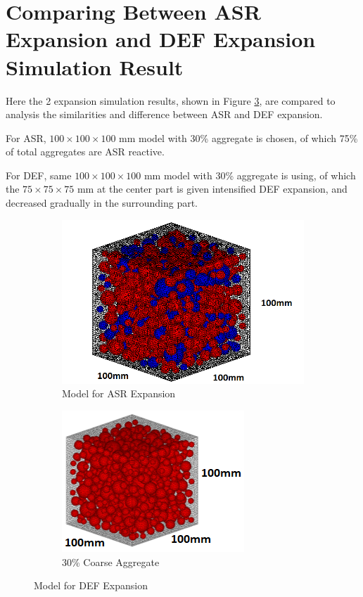 \clearpage
\section{Comparing Between ASR Expansion and DEF Expansion Simulation Result}


Here the 2 expansion simulation results, shown in Figure \ref{fig:Aggreddddate_Percentage}, are compared to analysis the similarities and difference between ASR and DEF expansion.

For ASR, $100 \times 100 \times 100$ mm model with 30\%  aggregate is chosen, of which 75\% of total aggregates are ASR reactive.

For DEF, same $100 \times 100 \times 100$ mm model with 30\%  aggregate is using, of which the $75 \times 75 \times 75$ mm at the center part is given intensified DEF expansion, and decreased gradually in the surrounding part.

\begin{figure}[!h]
\centering
\begin{subfigure}{.5\textwidth}
  \centering
  \includegraphics[width=.8\linewidth]{Files/Aggregate/A30P75.png}
  \caption{Model for ASR Expansion}
  \label{fig:A15_model}
\end{subfigure}%
\begin{subfigure}{.5\textwidth}
  \centering
  \includegraphics[width=.7\linewidth]{Files/Aggregate/A30.png}
  \caption{30\% Coarse Aggregate}
  \label{fig:A15_model}
\end{subfigure}
\caption{Model for DEF Expansion}
\label{fig:Aggreddddate_Percentage}
\end{figure}

